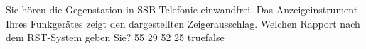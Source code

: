    {Sie hören die Gegenstation in SSB-Telefonie einwandfrei. Das Anzeigeinstrument Ihres Funkgerätes zeigt den dargestellten Zeigerausschlag. Welchen Rapport nach dem RST-System geben Sie?}
    {55}
    {29}
    {52}
    {25}
    {true}{false}